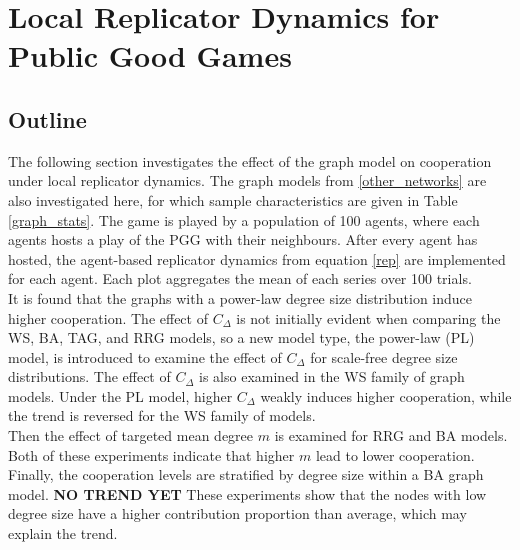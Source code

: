 \section{Local Replicator Dynamics for Public Good Games}
\subsection{Outline}
The following section investigates the effect of the graph model on cooperation under local replicator dynamics. The graph models from \ref{other_networks} are also investigated here, for which sample characteristics are given in Table \ref{graph_stats}. The game is played by a population of 100 agents, where each agents hosts a play of the PGG with their neighbours. After every agent has hosted, the agent-based replicator dynamics from equation \eqref{rep} are implemented for each agent. Each plot aggregates the mean of each series over 100 trials. \\

It is found that the graphs with a power-law degree size distribution induce higher cooperation. The effect of $C_\Delta$ is not initially evident when comparing the WS, BA, TAG, and RRG models, so a new model type, the power-law (PL) model, is introduced to examine the effect of $C_\Delta$ for scale-free degree size distributions. The effect of $C_\Delta$ is also examined in the WS family of graph models. Under the PL model, higher $C_\Delta$ weakly induces higher cooperation, while the trend is reversed for the WS family of models. \\

Then the effect of targeted mean degree $m$ is examined for RRG and BA models. Both of these experiments indicate that higher $m$ lead to lower cooperation. Finally, the cooperation levels are stratified by degree size within a BA graph model. \textbf{NO TREND YET} These experiments show that the nodes with low degree size have a higher contribution proportion than average, which may explain the trend. \\

